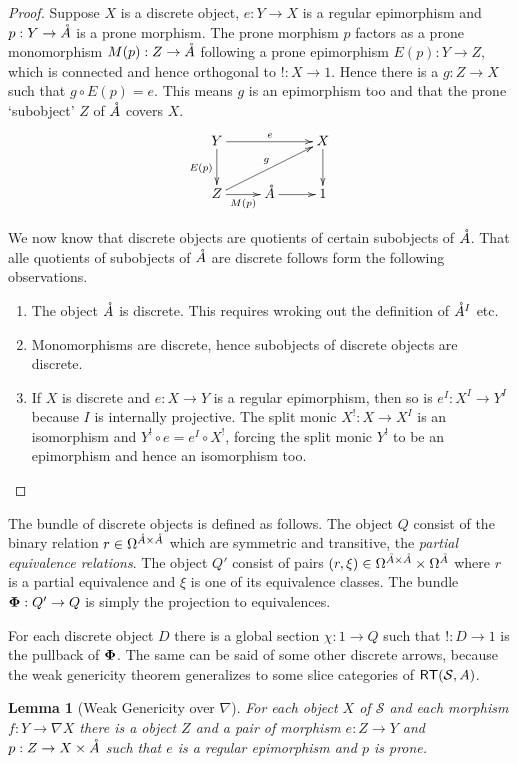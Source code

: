 \documentclass{amsart}
\theoremstyle{plain}
\newtheorem{lemma}[theorem]{Lemma}
\theoremstyle{definition}
\newcommand\cat\mathcal
\begin{document}
\begin{proof} Suppose $X$ is a discrete object, $e:Y\to X$ is a regular epimorphism and $p:Y\to {\mathring A}$ is a prone morphism. The prone morphism $p$ factors as a prone monomorphism $M(p):Z\to {\mathring A}$ following a prone epimorphism $E(p):Y\to Z$, which is connected and hence orthogonal to $!:X\to 1$. Hence there is a $g:Z\to X$ such that $g\circ E(p) = e$. This means $g$ is an epimorphism too and that the prone `subobject' $Z$ of ${\mathring A}$ covers $X$.
\[ \xymatrix{
Y\ar[d]_{E(p)} \ar[rr]^e && X\ar[d] \\
Z \ar[r]_{M(p)}\ar[urr]^g & \genpa\ar[r] & 1
}\]

We now know that discrete objects are quotients of certain subobjects of ${\mathring A}$. That alle quotients of subobjects of ${\mathring A}$ are discrete follows form the following observations.
\begin{enumerate}
\item The object ${\mathring A}$ is discrete. This requires wroking out the definition of ${\mathring A}^I$ etc.
\item Monomorphisms are discrete, hence subobjects of discrete objects are discrete.
\item If $X$ is discrete and $e:X\to Y$ is a regular epimorphism, then so is $e^I:X^I\to Y^I$ because $I$ is internally projective. The split monic $X^!:X\to X^I$ is an isomorphism and $Y^!\circ e = e^I\circ X^!$, forcing the split monic $Y^!$ to be an epimorphism and hence an isomorphism too.
\end{enumerate}

\end{proof}


The bundle of discrete objects is defined as follows. The object $Q$ consist of the binary relation $r\in \Omega^{{\mathring A}\times{\mathring A}}$ which are symmetric and transitive, the \emph{partial equivalence relations}. The object $Q'$ consist of pairs $(r,\xi)\in \Omega^{{\mathring A}\times{\mathring A}}\times\Omega^{\mathring A}$ where $r$ is a partial equivalence and $\xi$ is one of its equivalence classes. The bundle ${\bf\Phi}: Q'\to Q$ is simply the projection to equivalences.

For each discrete object $D$ there is a global section $\chi:1\to Q$ such that $!:D\to 1$ is the pullback of ${\bf\Phi}$. The same can be said of some other discrete arrows, because the weak genericity theorem generalizes to some slice categories of $\rt(\cat S,A)$.

\begin{lemma}[Weak Genericity over $\nabla$] For each object $X$ of $\cat S$ and each morphism $f:Y\to \nabla X$ there is a object $Z$ and a pair of morphism $e:Z\to Y$ and $p:Z\to X\times{\mathring A}$ such that $e$ is a regular epimorphism and $p$ is prone.\end{lemma}
\end{document}
